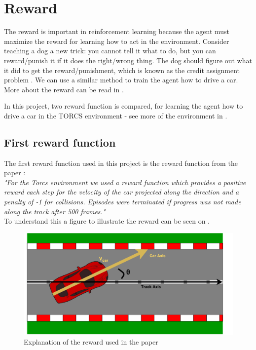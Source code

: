 \section{Reward}\label{sectionReward}
The reward is important in reinforcement learning because the agent must maximize the reward for learning how to act in the environment. Consider teaching a dog a new trick: you cannot tell it what to do, but you can reward/punish it if it does the right/wrong thing. The dog should figure out what it did to get the reward/punishment, which is known as the credit assignment problem \cite{reward_small}. We can use a similar method to train the agent how to drive a car. More about the reward can be read in .  

In this project, two reward function is compared, for learning the agent how to drive a car in the TORCS environment - see more of the environment in .  

\subsection*{First reward function}
The first reward function used in this project is the reward function from the paper \cite{DBLP:journals/corr/LillicrapHPHETS15}: \\
\textit{"For the Torcs environment we used a reward function which provides a positive reward each step for the velocity of the car projected along the direction and a penalty of -1 for collisions. Episodes were terminated if progress was not made along the track after 500 frames."}\\
To understand this a figure to illustrate the reward can be seen on .

\begin{figure}[H]
	\centering
	\includegraphics[width=1\textwidth]{Figures/Result/Reward_paper.pdf}
	\caption{Explanation of the reward used in the paper \cite{DBLP:journals/corr/LillicrapHPHETS15} }
	\label{fig:Reward_paper}
\end{figure}

